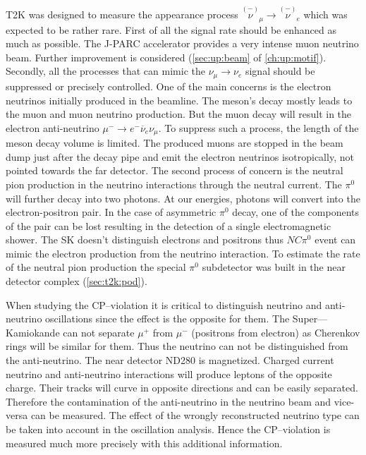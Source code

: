 \documentclass[../main.tex]{subfiles}
\begin{document}
T2K was designed to measure the appearance process $\overset{\scriptscriptstyle(-)}{\nu}_\mu\to\overset{\scriptscriptstyle(-)}{\nu}_e$ which was expected to be rather rare. First of all the signal rate should be enhanced as much as possible. The J-PARC accelerator provides a very intense muon neutrino beam. Further improvement is considered (\autoref{sec:up:beam} of \autoref{ch:up:motif}). Secondly, all the processes that can mimic the $\nu_\mu\to\nu_e$ signal should be suppressed or precisely controlled. One of the main concerns is the electron neutrinos initially produced in the beamline. The meson's decay mostly leads to the muon and muon neutrino production. But the muon decay will result in the electron anti-neutrino $\mu^-\to e^-\overline{\nu}_e\nu_\mu$. To suppress such a process, the length of the meson decay volume is limited. The produced muons are stopped in the beam dump just after the decay pipe and emit the electron neutrinos isotropically, not pointed towards the far detector. The second process of concern is the neutral pion production in the neutrino interactions through the neutral current. The $\pi^0$ will further decay into two photons. At our energies, photons will convert into the electron-positron pair. In the case of asymmetric $\pi^0$ decay, one of the components of the pair can be lost resulting in the detection of a single electromagnetic shower. The SK doesn't distinguish electrons and positrons thus $NC\pi^0$ event can mimic the electron production from the neutrino interaction. To estimate the rate of the neutral pion production the special $\pi^0$ subdetector was built in the near detector complex (\autoref{sec:t2k:pod}).

When studying the CP--violation it is critical to distinguish neutrino and anti-neutrino oscillations since the effect is the opposite for them. The Super---Kamiokande can not separate $\mu^+$ from $\mu^-$ (positrons from electron) as Cherenkov rings will be similar for them. Thus the neutrino can not be distinguished from the anti-neutrino. The near detector ND280 is magnetized. Charged current neutrino and anti-neutrino interactions will produce leptons of the opposite charge. Their tracks will curve in opposite directions and can be easily separated. Therefore the contamination of the anti-neutrino in the neutrino beam and vice-versa can be measured. The effect of the wrongly reconstructed neutrino type can be taken into account in the oscillation analysis. Hence the CP--violation is measured much more precisely with this additional information.
\end{document}
